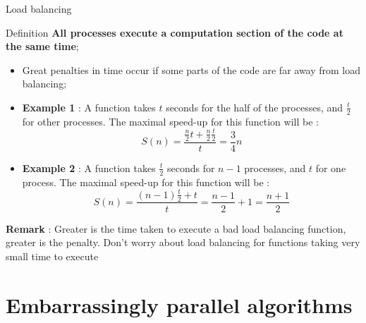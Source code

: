 \documentclass[compress,10pt,aspectratio=169]{beamer}
\begin{document}
\begin{frame}[fragile]{Load balancing}
    \scriptsize
    \begin{block}{Definition}
        \textbf{All processes execute a computation section of the code at the same time};
    \end{block}

    \begin{itemize}
        \item Great penalties in time occur if some parts of the code are far away from load balancing;
        \item \textbf{Example 1} : A function takes $t$ seconds for the half of the processes, and $\frac{t}{2}$
              for other processes. The maximal speed-up for this function will be :
            \[
                S(n) = \frac{\frac{n}{2}t + \frac{n}{2}\frac{t}{2}}{t} = \frac{3}{4}n
            \]
        \item \textbf{Example 2} : A function takes $\frac{t}{2}$ seconds for $n-1$ processes, and $t$
            for one process. The maximal speed-up for this function will be :
          \[
              S(n) = \frac{(n-1)\frac{t}{2} + t}{t} = \frac{n-1}{2} + 1 = \frac{n+1}{2}
          \]
  \end{itemize}

  \textbf{Remark} : Greater is the time taken to execute a  bad load balancing function, greater is the penalty. Don't worry
  about load balancing for functions taking very small time to execute
\end{frame}

\section{Embarrassingly parallel algorithms}
\end{document}
